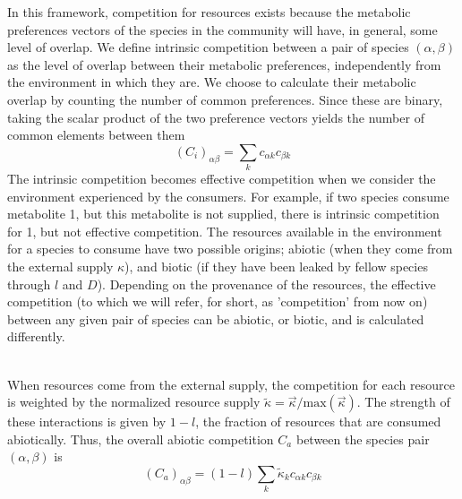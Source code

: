 \documentclass[12pt]{article}
\begin{document}
        	In this framework, competition for resources exists because the metabolic preferences vectors of the species in the community will have, in general, some level of overlap. We define intrinsic competition between  a pair of species $(\alpha, \beta)$ as the level of overlap between their metabolic preferences, independently from the environment in which they are. We choose to calculate their metabolic overlap by counting the number of common preferences. Since these are binary, taking the scalar product of the two preference vectors yields the number of common elements between them
        	\begin{equation}
        	    (C_i)_{\alpha \beta} = \sum_kc_{\alpha k}c_{\beta k}
        	\end{equation}
        	The intrinsic competition becomes effective competition when we consider the environment experienced by the consumers. For example, if two species consume metabolite 1, but this metabolite is not supplied, there is intrinsic competition for 1, but not effective competition. The resources available in the environment for a species to consume have two possible origins; abiotic (when they come from the external supply $\kappa$), and biotic (if they have been leaked by fellow species through $l$ and $D$). Depending on the provenance of the resources, the effective competition (to which we will refer, for short, as 'competition' from now on) between any given pair of species can be abiotic, or biotic, and is calculated differently.\par \\
        	When resources come from the external supply, the competition for each resource is weighted by the normalized resource supply $ \tilde{\kappa} = \vec{\kappa}/\text{max}(\vec{\kappa})$. The strength of these interactions is given by $1 - l$, the fraction of resources that are consumed abiotically. Thus, the overall abiotic competition $C_a$ between the species pair $(\alpha, \beta)$ is
        	\begin{equation}\label{abiotic}
        		(C_a)_{\alpha\beta} = (1-l) \sum_k \tilde{\kappa}_kc_{\alpha k}c_{\beta k}
        	\end{equation}
            
\end{document}
